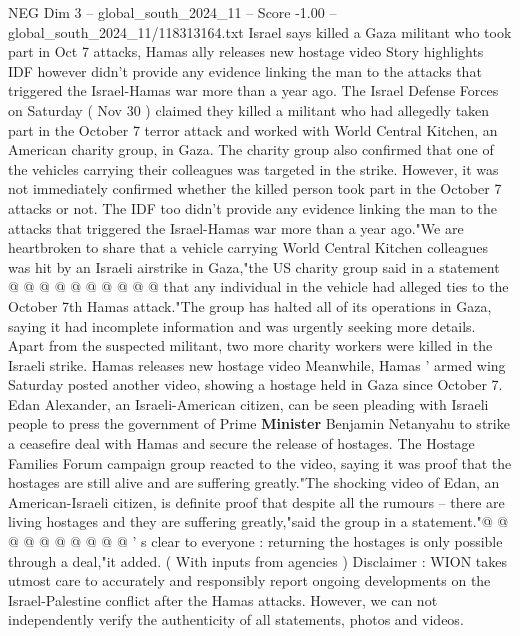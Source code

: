 \begin{textsample}{NEG Dim 3 – global\_south\_2024\_11 – Score -1.00 – global\_south\_2024\_11/118313164.txt}  \label{ex:f3_neg_137}
Israel says killed a Gaza militant who took part in Oct 7 attacks, Hamas ally releases new hostage video Story highlights IDF however didn't provide any evidence linking the man to the attacks that triggered the Israel-Hamas war more than a year ago.
The Israel Defense Forces on Saturday ( Nov 30 ) claimed they killed a militant who had allegedly taken part in the October 7 terror attack and worked with World Central Kitchen, an American charity group, in Gaza.
The charity group also confirmed that one of the vehicles carrying their colleagues was targeted in the strike.
However, it was not immediately confirmed whether the killed person took part in the October 7 attacks or not.
The IDF too didn't provide any evidence linking the man to the attacks that triggered the Israel-Hamas war more than a year ago."We are heartbroken to share that a vehicle carrying World Central Kitchen colleagues was hit by an Israeli airstrike in Gaza,"the US charity group said in a statement @ @ @ @ @ @ @ @ @ @ that any individual in the vehicle had alleged ties to the October 7th Hamas attack."The group has halted all of its operations in Gaza, saying it had incomplete information and was urgently seeking more details.
Apart from the suspected militant, two more charity workers were killed in the Israeli strike.
Hamas releases new hostage video Meanwhile, Hamas ' armed wing Saturday posted another video, showing a hostage held in Gaza since October 7.
Edan Alexander, an Israeli-American citizen, can be seen pleading with Israeli people to press the government of Prime \textbf{Minister} Benjamin Netanyahu to strike a ceasefire deal with Hamas and secure the release of hostages.
The Hostage Families Forum campaign group reacted to the video, saying it was proof that the hostages are still alive and are suffering greatly."The shocking video of Edan, an American-Israeli citizen, is definite proof that despite all the rumours -- there are living hostages and they are suffering greatly,"said the group in a statement."@ @ @ @ @ @ @ @ @ @ ' s clear to everyone : returning the hostages is only possible through a deal,"it added. ( With inputs from agencies ) Disclaimer : WION takes utmost care to accurately and responsibly report ongoing developments on the Israel-Palestine conflict after the Hamas attacks.
However, we can not independently verify the authenticity of all statements, photos and videos.

\end{textsample}
